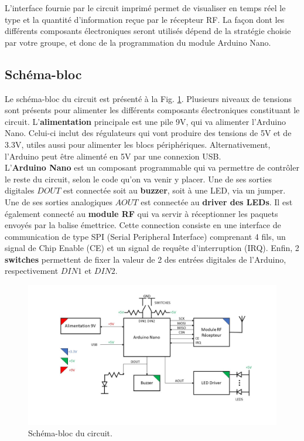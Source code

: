 \documentclass[a4paper,10pt,twoside]{article}
\begin{document}
L'interface fournie par le circuit imprimé permet de visualiser en temps réel le type et la quantité d'information reçue par le récepteur RF. La façon dont les différents composants électroniques seront utilisés dépend de la stratégie choisie par votre groupe, et donc de la programmation du module Arduino Nano.

\subsection{Schéma-bloc}
Le schéma-bloc du circuit est présenté à la Fig. \ref{fig:schema-bloc}. Plusieurs niveaux de tensions sont présents pour alimenter les différents composants électroniques constituant le circuit. L'\textbf{alimentation} principale est une pile 9V, qui va alimenter l'Arduino Nano. Celui-ci inclut des régulateurs qui vont produire des tensions de 5V et de 3.3V, utiles aussi pour alimenter les blocs périphériques. Alternativement, l'Arduino peut être alimenté en 5V par une connexion USB.\\

L'\textbf{Arduino Nano} est un composant programmable qui va permettre de contrôler le reste du circuit, selon le code qu'on va venir y placer. Une de ses sorties digitales $DOUT$ est connectée soit au \textbf{buzzer}, soit à une LED, via un jumper. Une de ses sorties analogiques $AOUT$ est connectée au \textbf{driver des LEDs}. Il est également connecté au \textbf{module RF} qui va servir à réceptionner les paquets envoyés par la balise émettrice. Cette connection consiste en une interface de communication de type SPI (Serial Peripheral Interface) comprenant 4 fils, un signal de Chip Enable (CE) et un signal de requête d'interruption (IRQ). Enfin, 2 \textbf{switches} permettent de fixer la valeur de 2 des entrées digitales de l'Arduino, respectivement $DIN1$ et $DIN2$.\\

\begin{figure}[!ht]
	\centering
	\includegraphics[width=\textwidth]{imgs/schema-bloc.jpg}
	\caption{Schéma-bloc du circuit.}
	\label{fig:schema-bloc}
\end{figure}
\end{document}
